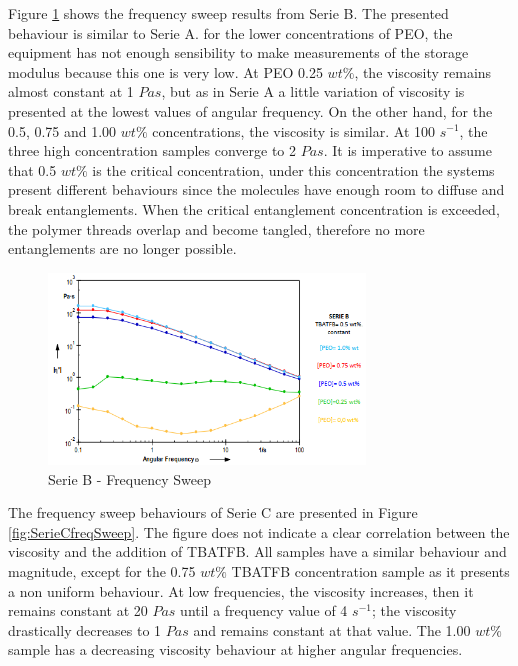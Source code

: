 Figure \ref{fig:SerieBfreqSweep} shows the frequency sweep results from Serie B. The presented behaviour is similar to Serie A. for the lower concentrations of PEO, the equipment has not enough sensibility to make measurements of the storage modulus because this one is very low. At PEO 0.25 $w t \%$, the viscosity remains almost constant at 1 $Pa s$, but as in Serie A a little variation of viscosity is presented at the lowest values of angular frequency. On the other hand, for the 0.5, 0.75 and 1.00 $w t \%$ concentrations, the viscosity is similar. At 100 $s^{-1}$, the three high concentration samples converge to 2 $Pa s$. It is imperative to assume that 0.5 $w t \%$ is the critical concentration, under this concentration the systems present different behaviours since the molecules have enough room to diffuse and break entanglements. When the critical entanglement concentration is exceeded, the polymer threads overlap and become tangled, therefore no more entanglements are no longer possible.

\begin{figure}[th]
\centering
\includegraphics[width=0.75\textwidth]{./Figures/SerieBfreqSweep.png}
\decoRule
\caption[Serie B - Frequency Sweep]{Serie B - Frequency Sweep \cite{Flores2017}}
\label{fig:SerieBfreqSweep}
\end{figure}

The frequency sweep behaviours of Serie C are presented in Figure \ref{fig:SerieCfreqSweep}. The figure does not indicate a clear correlation between the viscosity and the addition of TBATFB. All samples have a similar behaviour and magnitude, except for the 0.75 $w t \%$ TBATFB concentration sample as it presents a non uniform behaviour. At low frequencies, the viscosity increases, then it remains constant at 20 $Pa s$ until a frequency value of 4 $s^{-1}$; the viscosity drastically decreases to 1 $Pa s$ and remains constant at that value. The 1.00 $w t \%$ sample has a decreasing viscosity behaviour at higher angular frequencies. 

